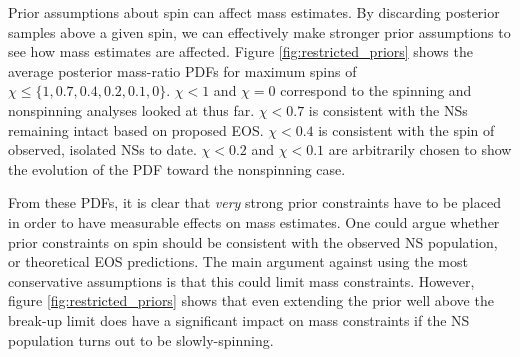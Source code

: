 Prior assumptions about spin can affect mass estimates.  By discarding posterior samples above a given spin, we can effectively make stronger prior assumptions to see how mass estimates are affected.  Figure \ref{fig:restricted_priors} shows the average posterior mass-ratio PDFs for maximum spins of $\chi \leq \{1, 0.7, 0.4, 0.2, 0.1, 0\}$.  $\chi<1$ and $\chi=0$ correspond to the spinning and nonspinning analyses looked at thus far.  $\chi<0.7$ is consistent with the NSs remaining intact based on proposed EOS.  $\chi<0.4$ is consistent with the spin of observed, isolated NSs to date.  $\chi<0.2$ and $\chi<0.1$ are arbitrarily chosen to show the evolution of the PDF toward the nonspinning case.

From these PDFs, it is clear that \emph{very} strong prior constraints have to be placed in order to have measurable effects on mass estimates. One could argue whether prior constraints on spin should be consistent with the observed NS population, or theoretical EOS predictions.  The main argument against using the most conservative assumptions is that this could limit mass constraints.  However, figure \ref{fig:restricted_priors} shows that even extending the prior well above the break-up limit does have a significant impact on mass constraints if the NS population turns out to be slowly-spinning.